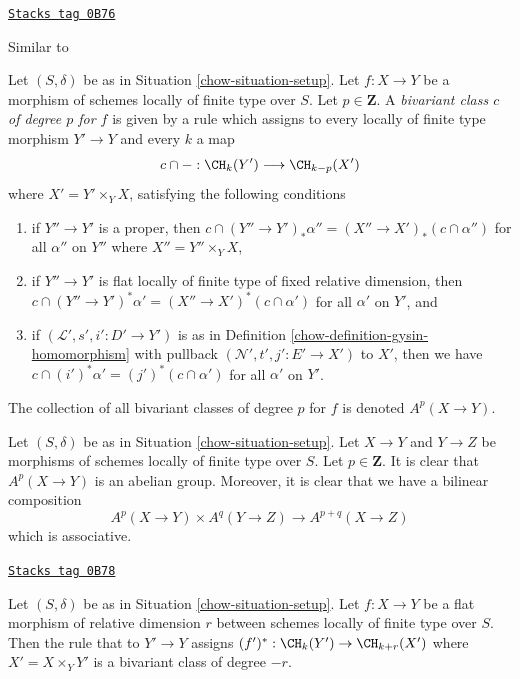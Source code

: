 \begin{definition}
\label{chow-definition-bivariant-class}
\href{https://stacks.math.columbia.edu/tag/0B76}{\texttt{Stacks tag 0B76}}

\begin{reference}
Similar to \cite[Definition 17.1]{F}
\end{reference}
Let $(S, \delta)$ be as in Situation \ref{chow-situation-setup}.
Let $f : X \to Y$ be a morphism of schemes locally of finite type over $S$.
Let $p \in \mathbf{Z}$.
A {\it bivariant class $c$ of degree $p$ for $f$} is given by a rule
which assigns to every locally of finite type morphism $Y' \to Y$
and every $k$ a map
$$
c \cap - : \CH_k(Y') \longrightarrow \CH_{k - p}(X')
$$
where $X' = Y' \times_Y X$, satisfying the following conditions
\begin{enumerate}
\item if $Y'' \to Y'$ is a proper, then
$c \cap (Y'' \to Y')_*\alpha'' = (X'' \to X')_*(c \cap \alpha'')$
for all $\alpha''$ on $Y''$ where $X'' = Y'' \times_Y X$,
\item if $Y'' \to Y'$ is flat locally of finite type of
fixed relative dimension, then
$c \cap (Y'' \to Y')^*\alpha' = (X'' \to X')^*(c \cap \alpha')$
for all $\alpha'$ on $Y'$, and
\item if $(\mathcal{L}', s', i' : D' \to Y')$ is as in
Definition \ref{chow-definition-gysin-homomorphism}
with pullback $(\mathcal{N}', t', j' : E' \to X')$ to $X'$,
then we have $c \cap (i')^*\alpha' = (j')^*(c \cap \alpha')$
for all $\alpha'$ on $Y'$.
\end{enumerate}
The collection of all bivariant classes of degree $p$ for $f$ is
denoted $A^p(X \to Y)$.
\end{definition}

Let $(S, \delta)$ be as in Situation \ref{chow-situation-setup}. Let $X \to Y$
and $Y \to Z$
be morphisms of schemes locally of finite type over $S$. Let
$p \in \mathbf{Z}$. It is clear that $A^p(X \to Y)$ is an abelian group.
Moreover, it is clear that we have a bilinear composition
$$
A^p(X \to Y) \times A^q(Y \to Z) \to A^{p + q}(X \to Z)
$$
which is associative.

\begin{lemma}
\label{chow-lemma-flat-pullback-bivariant}
\href{https://stacks.math.columbia.edu/tag/0B78}{\texttt{Stacks tag 0B78}}

Let $(S, \delta)$ be as in Situation \ref{chow-situation-setup}.
Let $f : X \to Y$ be a flat morphism of relative dimension $r$
between schemes locally of finite type over $S$.
Then the rule that to $Y' \to Y$ assigns
$(f')^* : \CH_k(Y') \to \CH_{k + r}(X')$ where $X' = X \times_Y Y'$
is a bivariant class of degree $-r$.
\end{lemma}

